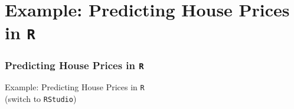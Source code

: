 \documentclass[
  shownotes,
  xcolor={svgnames},
  hyperref={colorlinks,citecolor=DarkBlue,linkcolor=DarkRed,urlcolor=DarkBlue}
  ]{beamer}
\begin{document}
\section{ Example: Predicting House Prices in \texttt{R}}
\begin{frame}
\frametitle{Predicting House Prices in \texttt{R}}

\begin{center}
\large Example: Predicting House Prices in \texttt{R} \\
(switch to \texttt{RStudio})
\end{center}


\end{frame}


\end{document}
